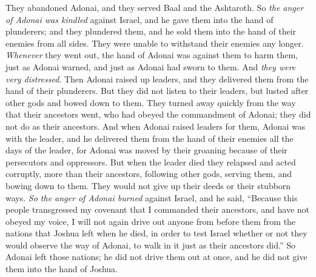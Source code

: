 \begin{biblechapter}
\verse They abandoned Adonai, and they served Baal and the Ashtaroth.
\verse So \textit{the anger of Adonai was kindled} against Israel, and he gave them into the hand of plunderers; and they plundered them, and he sold them into the hand of their enemies from all sides. They were unable to withstand their enemies any longer.
\verse \textit{Whenever} they went out, the hand of Adonai was against them to harm them, just as Adonai warned, and just as Adonai had sworn to them. And \textit{they were very distressed}.
\verse Then Adonai raised up leaders, and they delivered them from the hand of their plunderers.
\verse But they did not listen to their leaders, but lusted after other gods and bowed down to them. They turned away quickly from the way that their ancestors went, who had obeyed the commandment of Adonai; they did not do as their ancestors.
\verse And when Adonai raised leaders for them, Adonai was with the leader, and he delivered them from the hand of their enemies all the days of the leader, for Adonai was moved by their groaning because of their persecutors and oppressors.
\verse But when the leader died they relapsed and acted corruptly, more than their ancestors, following other gods, serving them, and bowing down to them. They would not give up their deeds or their stubborn ways.
\verse \textit{So the anger of Adonai burned} against Israel, and he said, “Because this people transgressed my covenant that I commanded their ancestors, and have not obeyed my voice,
\verse I will not again drive out anyone from before them from the nations that Joshua left when he died,
\verse in order to test Israel whether or not they would observe the way of Adonai, to walk in it just as their ancestors did.”
\verse So Adonai left those nations; he did not drive them out at once, and he did not give them into the hand of Joshua.
\end{biblechapter}

